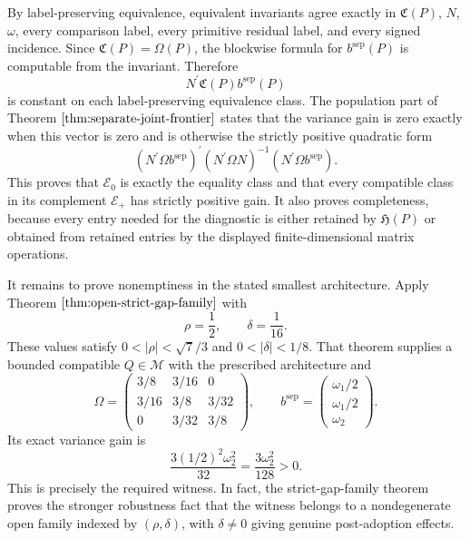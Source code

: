 By label-preserving equivalence, equivalent invariants agree exactly in \(\mathfrak C(P)\), \(N\), \(\omega\), every comparison label, every primitive residual label, and every signed incidence.  Since \(\mathfrak C(P)=\Omega(P)\), the blockwise formula for \(b^{\mathrm{sep}}(P)\) is computable from the invariant.  Therefore
\[
 N^{\prime}\mathfrak C(P)b^{\mathrm{sep}}(P)
\]
is constant on each label-preserving equivalence class.  The population part of Theorem \(\ref{thm:separate-joint-frontier}\) states that the variance gain is zero exactly when this vector is zero and is otherwise the strictly positive quadratic form
\[
 (N^{\prime}\Omega b^{\mathrm{sep}})^{\prime}
 (N^{\prime}\Omega N)^{-1}
 (N^{\prime}\Omega b^{\mathrm{sep}}).
\]
This proves that \(\mathscr E_0\) is exactly the equality class and that every compatible class in its complement \(\mathscr E_+\) has strictly positive gain.  It also proves completeness, because every entry needed for the diagnostic is either retained by \(\mathfrak H(P)\) or obtained from retained entries by the displayed finite-dimensional matrix operations.

It remains to prove nonemptiness in the stated smallest architecture.  Apply Theorem \(\ref{thm:open-strict-gap-family}\) with
\[
 \rho=\frac12,
 \qquad
 \delta=\frac1{16}.
\]
These values satisfy \(0<|\rho|<\sqrt7/3\) and \(0<|\delta|<1/8\).  That theorem supplies a bounded compatible \(Q\in\mathcal M\) with the prescribed architecture and
\[
 \Omega=
 \begin{pmatrix}
 3/8&3/16&0\\
 3/16&3/8&3/32\\
 0&3/32&3/8
 \end{pmatrix},
 \qquad
 b^{\mathrm{sep}}=
 \begin{pmatrix}\omega_1/2\\ \omega_1/2\\ \omega_2\end{pmatrix}.
\]
Its exact variance gain is
\[
 \frac{3(1/2)^2\omega_2^2}{32}
 =\frac{3\omega_2^2}{128}>0.
\]
This is precisely the required witness.  In fact, the strict-gap-family theorem proves the stronger robustness fact that the witness belongs to a nondegenerate open family indexed by \((\rho,\delta)\), with \(\delta\ne0\) giving genuine post-adoption effects.